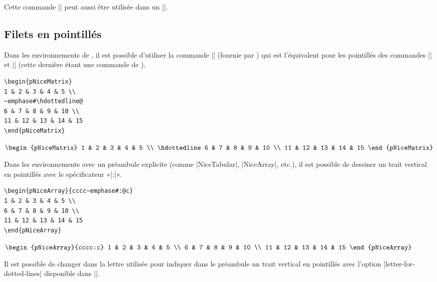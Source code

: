 \documentclass[dvipsnames]{article}%
\begin{document}
\medskip
Cette commande |\diagbox| peut aussi être utilisée dans un |\Block|.



\subsection{Filets en pointillés}


Dans les environnements de , il est possible d'utiliser la
commande |\hdottedline| (fournie par ) qui est l'équivalent pour
les pointillés des commandes |\hline| et |\hdashline| (cette dernière étant une
commande de ).

\medskip
\begin{BVerbatim}[baseline=c,boxwidth=9.5cm]
\begin{pNiceMatrix}
1 & 2 & 3 & 4 & 5 \\
~emphase#\hdottedline@
6 & 7 & 8 & 9 & 10 \\
11 & 12 & 13 & 14 & 15 
\end{pNiceMatrix}
\end{BVerbatim}
$\begin{pNiceMatrix}
1 & 2 & 3 & 4 & 5 \\
\hdottedline
6 & 7 & 8 & 9 & 10 \\
11 & 12 & 13 & 14 & 15 
\end{pNiceMatrix}$


\bigskip
Dans les environnements avec un préambule explicite (comme |{NiceTabular}|,
|{NiceArray}|, etc.), il est possible de dessiner un trait vertical en
pointillés avec le spécificateur «|:|».

\medskip
\begin{BVerbatim}[baseline=c,boxwidth=9.5cm]
\begin{pNiceArray}{cccc~emphase#:@c}
1 & 2 & 3 & 4 & 5 \\
6 & 7 & 8 & 9 & 10 \\
11 & 12 & 13 & 14 & 15 
\end{pNiceArray}
\end{BVerbatim}
$\begin{pNiceArray}{cccc:c}
1 & 2 & 3 & 4 & 5 \\
6 & 7 & 8 & 9 & 10 \\
11 & 12 & 13 & 14 & 15 
\end{pNiceArray}$

\bigskip
Il est possible de changer dans  la lettre utilisée pour
indiquer dans le préambule un trait vertical en pointillés avec l'option
|letter-for-dotted-lines| disponible dans |\NiceMatrixOptions|.
\end{document}
